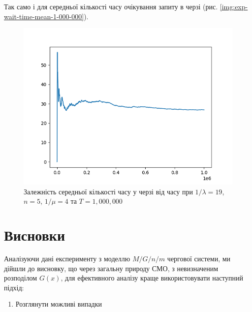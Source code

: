 \documentclass[14pt]{extarticle}
\begin{document}
Так само і для середньої кількості часу очікування запиту в черзі (рис. \ref{img:exp-wait-time-mean-1-000-000}).

\begin{figure}
  \centering
  \includegraphics{1_000_000_seconds-waiting_mean.png}\caption{{Залежність
      середньої кількості часу у черзі від часу при \(1/\lambda = 19\), \(n = 5\),
      \(1/\mu = 4\) та
      \(T = 1,000,000\)}}\label{img:exp-wait-time--mean-1-000-000}
\end{figure}

\newpage

\section{Висновки}

Аналізуючи дані експерименту з моделлю \(M/G/n/m\) чергової системи, ми дійшли
до висновку, що через загальну природу СМО, з невизначеним розподілом \(G(x)\), для ефективного аналізу краще використовувати наступний підхід:

\begin{enumerate}
  \item Розглянути можливі випадки
\end{enumerate}

\newpage

\printbibliography
\end{document}

